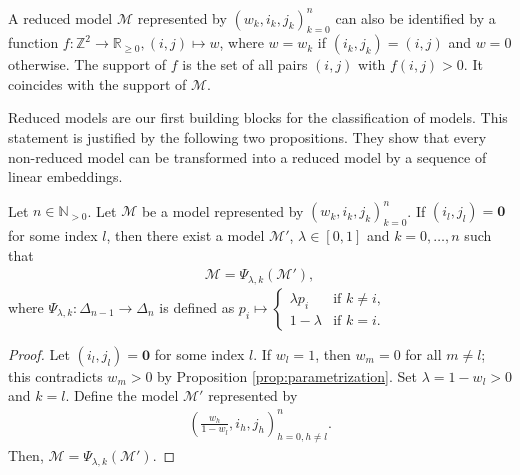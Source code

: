 \begin{remark}\label{rem:representation-of-models-by-functions}
    A reduced model \( \mathcal{M} \) represented by \( (w_k, i_k, j_k)_{k=0}^n \) can also be identified by a function \( f: \mathbb{Z}^2 \to \mathbb{R}_{\geq 0}, (i, j) \mapsto w \), where \( w = w_k \) if \( (i_k, j_k) = (i, j) \) and \( w = 0 \) otherwise. The support of \( f \) is the set of all pairs \( (i, j) \) with \( f(i, j) > 0 \). It coincides with the support of \( \mathcal{M} \).
\end{remark}


Reduced models are our first building blocks for the classification of models. This statement is justified by the following two propositions. They show that every non-reduced model can be transformed into a reduced model by a sequence of linear embeddings.

\begin{proposition}\label{prop:linear-embedding-1}
    Let \( n \in \mathbb{N}_{>0} \).
    Let \( \mathcal{M} \) be a model represented by \( (w_k, i_k, j_k)_{k=0}^n \). If \( (i_l, j_l) = \mathbf{0} \) for some index \( l \), then there exist a model \( \mathcal{M}' \), \( \lambda \in [0,1] \) and \( k = 0, \dots, n \) such that
    \begin{align*}
        \mathcal{M} = \Psi_{\lambda,k}(\mathcal{M}'),
    \end{align*}
    where \( \Psi_{\lambda, k}: \Delta_{n-1} \to \Delta_n \) is defined as \(  p_i \mapsto \begin{cases}
        \lambda p_i & \text{if } k \neq i, \\
        1-\lambda & \text{if } k = i.
    \end{cases} \)
\end{proposition}

\begin{proof}
    Let \( (i_l, j_l) = \mathbf{0} \) for some index \( l \). If \( w_l = 1 \), then \( w_m = 0 \) for all \( m \neq l \); this contradicts \( w_m > 0 \) by Proposition \ref{prop:parametrization}. Set \( \lambda = 1 - w_l > 0 \) and \( k = l \). Define the model \( \mathcal{M}' \) represented by 
    \begin{align*}
        \left(\frac{w_h}{1-w_l}, i_h, j_h\right)^n_{h=0, h \neq l}.
    \end{align*}
    Then, \( \mathcal{M} = \Psi_{\lambda,k}(\mathcal{M}') \).
\end{proof}

